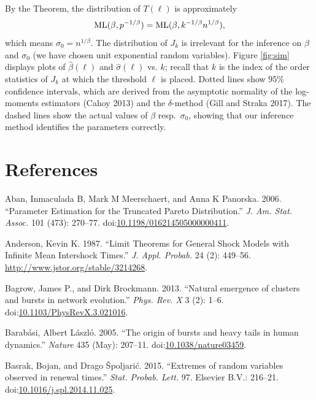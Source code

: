 \documentclass[smallextended]{svjour3}       %
\begin{document}
By the Theorem, the distribution of \(T(\ell)\) is approximately \[
{\rm ML}(\beta, p^{-1/\beta}) 
= {\rm ML}(\beta, k^{-1/\beta} n^{1/\beta}),
\] which means \(\sigma_0 = n^{1/\beta}\). The distribution of \(J_k\)
is irrelevant for the inference on \(\beta\) and \(\sigma_0\) (we have
chosen unit exponential random variables). Figure \ref{fig:sim} displays
plots of \(\hat \beta(\ell)\) and \(\hat \sigma(\ell)\) vs. \(k\);
recall that \(k\) is the index of the order statistics of \(J_k\) at
which the threshold \(\ell\) is placed. Dotted lines show 95\%
confidence intervals, which are derived from the asymptotic normality of
the log-moments estimators (Cahoy 2013) and the \(\delta\)-method (Gill
and Straka 2017). The dashed lines show the actual values of \(\beta\)
resp.~\(\sigma_0\), showing that our inference method identifies the
parameters correctly.

\section*{References}\label{references}

\hypertarget{refs}{}
\hypertarget{ref-Aban06}{}
Aban, Inmaculada B, Mark M Meerschaert, and Anna K Panorska. 2006.
``Parameter Estimation for the Truncated Pareto Distribution.'' \emph{J.
Am. Stat. Assoc.} 101 (473): 270--77.
doi:\href{https://doi.org/10.1198/016214505000000411}{10.1198/016214505000000411}.

\hypertarget{ref-Anderson1987}{}
Anderson, Kevin K. 1987. ``Limit Theorems for General Shock Models with
Infinite Mean Intershock Times.'' \emph{J. Appl. Probab.} 24 (2):
449--56. \url{http://www.jstor.org/stable/3214268}.

\hypertarget{ref-Bagrow2013}{}
Bagrow, James P., and Dirk Brockmann. 2013. ``Natural emergence of
clusters and bursts in network evolution.'' \emph{Phys. Rev. X} 3 (2):
1--6.
doi:\href{https://doi.org/10.1103/PhysRevX.3.021016}{10.1103/PhysRevX.3.021016}.

\hypertarget{ref-Barabasi2005}{}
Barabási, Albert László. 2005. ``The origin of bursts and heavy tails in
human dynamics.'' \emph{Nature} 435 (May): 207--11.
doi:\href{https://doi.org/10.1038/nature03459}{10.1038/nature03459}.

\hypertarget{ref-Basrak2014}{}
Basrak, Bojan, and Drago Špoljarić. 2015. ``Extremes of random variables
observed in renewal times.'' \emph{Stat. Probab. Lett.} 97. Elsevier
B.V.: 216--21.
doi:\href{https://doi.org/10.1016/j.spl.2014.11.025}{10.1016/j.spl.2014.11.025}.
\end{document}
